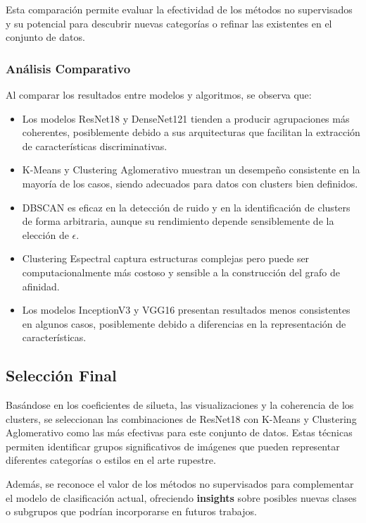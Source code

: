 Esta comparación permite evaluar la efectividad de los métodos no supervisados y su potencial para descubrir nuevas categorías o refinar las existentes en el conjunto de datos.

\subsubsection{Análisis Comparativo}

Al comparar los resultados entre modelos y algoritmos, se observa que:

\begin{itemize}
    \item Los modelos ResNet18 y DenseNet121 tienden a producir agrupaciones más coherentes, posiblemente debido a sus arquitecturas que facilitan la extracción de características discriminativas.
    \item K-Means y Clustering Aglomerativo muestran un desempeño consistente en la mayoría de los casos, siendo adecuados para datos con clusters bien definidos.
    \item DBSCAN es eficaz en la detección de ruido y en la identificación de clusters de forma arbitraria, aunque su rendimiento depende sensiblemente de la elección de $\epsilon$.
    \item Clustering Espectral captura estructuras complejas pero puede ser computacionalmente más costoso y sensible a la construcción del grafo de afinidad.
    \item Los modelos InceptionV3 y VGG16 presentan resultados menos consistentes en algunos casos, posiblemente debido a diferencias en la representación de características.
\end{itemize}

\subsection{Selección Final}

Basándose en los coeficientes de silueta, las visualizaciones y la coherencia de los clusters, se seleccionan las combinaciones de ResNet18 con K-Means y Clustering Aglomerativo como las más efectivas para este conjunto de datos.
Estas técnicas permiten identificar grupos significativos de imágenes que pueden representar diferentes categorías o estilos en el arte rupestre.

Además, se reconoce el valor de los métodos no supervisados para complementar el modelo de clasificación actual, ofreciendo \textbf{insights} sobre posibles nuevas clases o subgrupos que podrían incorporarse en futuros trabajos.

